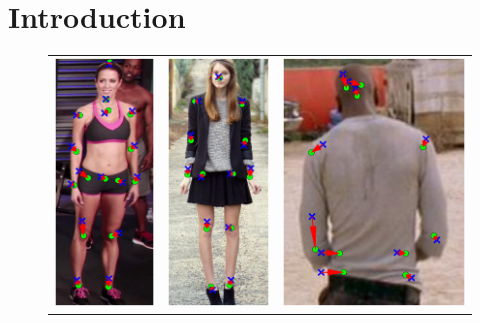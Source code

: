 
\section{Introduction}



\setlength{\tabcolsep}{1pt}
\begin{figure}[t!]
        \begin{tabular}{ccc}
        \includegraphics[height=.65\columnwidth]{resources/MotivativeAnnotation/MPII}
        &
        \includegraphics[height=.65\columnwidth]{resources/MotivativeAnnotation/FashionPose}
        &
        \includegraphics[trim=50 0 50 0,clip,height=.65\columnwidth]{resources/MotivativeAnnotation/FLIC}

\end{tabular}
\end{figure}
